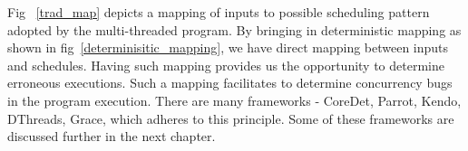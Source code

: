 Fig~ \ref{trad_map} depicts a mapping of inputs to possible scheduling pattern adopted by the multi-threaded program. 
By bringing in deterministic mapping as shown in fig~\ref{determinisitic_mapping}, we have direct mapping between inputs and schedules. 
Having such mapping provides us the opportunity to determine erroneous executions. 
Such a mapping facilitates to determine concurrency bugs in the program execution. 
There are many frameworks - CoreDet\cite{coredet}, Parrot\cite{parrot}, Kendo\cite{kendo}, DThreads\cite{dthreads}, Grace\cite{grace}, which adheres to this principle. 
Some of these frameworks are discussed further in the next chapter.

%
%
%
